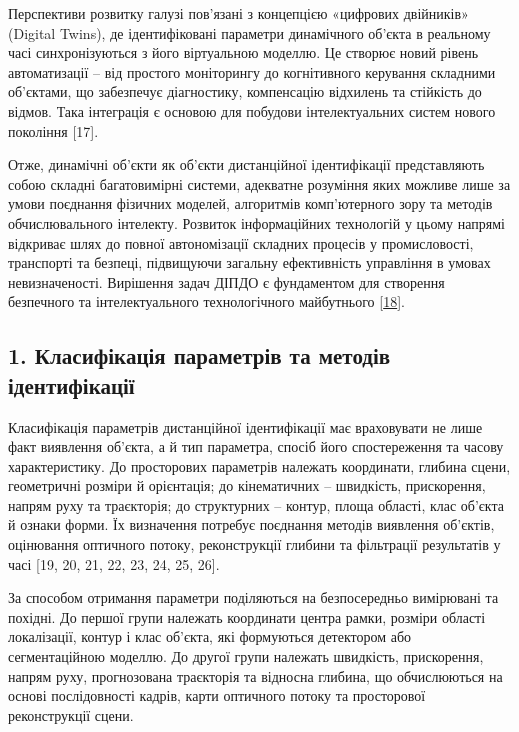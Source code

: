 \documentclass[
]{article}
\begin{document}
Перспективи розвитку галузі пов'язані з концепцією «цифрових двійників» (Digital Twins), де ідентифіковані параметри динамічного об'єкта в реальному часі синхронізуються з його віртуальною моделлю. Це створює новий рівень автоматизації -- від простого моніторингу до когнітивного керування складними об'єктами, що забезпечує діагностику, компенсацію відхилень та стійкість до відмов. Така інтеграція є основою для побудови інтелектуальних систем нового покоління {[}17{]}.

Отже, динамічні об'єкти як об'єкти дистанційної ідентифікації представляють собою складні багатовимірні системи, адекватне розуміння яких можливе лише за умови поєднання фізичних моделей, алгоритмів комп'ютерного зору та методів обчислювального інтелекту. Розвиток інформаційних технологій у цьому напрямі відкриває шлях до повної автономізації складних процесів у промисловості, транспорті та безпеці, підвищуючи загальну ефективність управління в умовах невизначеності. Вирішення задач ДІПДО є фундаментом для створення безпечного та інтелектуального технологічного майбутнього {[}\hyperref[_Ref221550419]{18}{]}.

\subsection{1. Класифікація параметрів та методів ідентифікації}\label{ux43aux43bux430ux441ux438ux444ux456ux43aux430ux446ux456ux44f-ux43fux430ux440ux430ux43cux435ux442ux440ux456ux432-ux442ux430-ux43cux435ux442ux43eux434ux456ux432-ux456ux434ux435ux43dux442ux438ux444ux456ux43aux430ux446ux456ux457}

Класифікація параметрів дистанційної ідентифікації має враховувати не лише факт виявлення об'єкта, а й тип параметра, спосіб його спостереження та часову характеристику. До просторових параметрів належать координати, глибина сцени, геометричні розміри й орієнтація; до кінематичних -- швидкість, прискорення, напрям руху та траєкторія; до структурних -- контур, площа області, клас об'єкта й ознаки форми. Їх визначення потребує поєднання методів виявлення об'єктів, оцінювання оптичного потоку, реконструкції глибини та фільтрації результатів у часі {[}19, 20, 21, 22, 23, 24, 25, 26{]}.

За способом отримання параметри поділяються на безпосередньо вимірювані та похідні. До першої групи належать координати центра рамки, розміри області локалізації, контур і клас об'єкта, які формуються детектором або сегментаційною моделлю. До другої групи належать швидкість, прискорення, напрям руху, прогнозована траєкторія та відносна глибина, що обчислюються на основі послідовності кадрів, карти оптичного потоку та просторової реконструкції сцени.
\end{document}
